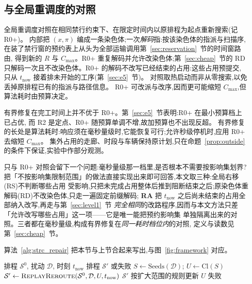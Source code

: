\documentclass[manuscript,screen,review]{acmart}
\begin{document}
\subsection{与全局重调度的对照}
\label{sec:vs_r0}

全局重调度对照在相同禁行约束下、在限定时间内以原排程为起点重新搜索(记 R0+)。
内部把 \((x,\pi)\) 编成一条染色体;一次\emph{解码}指:按该染色体的指派与扫描序,
在装了禁行窗的预约表上从头为全部运输调用第~\ref{sec:reservation}~节的时间窗路由,
得到新的 \(R\) 与 \(C_{\max}\)。R0+ 重复解码并允许改染色体;第~\ref{sec:cheap}~节的
RD 只解码一次且不改染色体。R0+ 的解码不改写已经结束的占用:这些占用预提交,
只从 \(t_{\mathrm{now}}\) 接着排未开始的工序(第~\ref{sec:e5}~节)。
对照取热启动而非从零搜索,以免丢掉原排程已有的指派与路径信息。
R0+ 可改派与改序,因而更可能缩短 \(C_{\max}\),但算法耗时由预算决定。

有界修复在完工时间上并不优于 R0+。第~\ref{sec:e5}~节表明:R0+ 在最小预算档上已占优,
而 R2 是定点、R0+ 随预算单调不增,故加预算也不出现反超。
有界修复的长处是算法耗时:响应须在毫秒量级时,它能恢复可行;允许秒级停机时,应用 R0+ 去缩短 \(C_{\max}\)。
集外占用的走廊、时段与车辆保持原计划,只在命题~\ref{prop:outside} 的条件下保证,实验中作部分观测。

只与 R0+ 对照会留下一个问题:毫秒量级那一档里,是否根本不需要按影响集划界?
把「不按影响集限制范围」的做法直接实现出来即可回答,本文取三种:全局右移(RS)不判断哪些占用
受影响,只把未完成占用整体后推到阻断结束之后;原染色体重解码(RD)不改染色体,只走一遍固定前缀解码;
\textbf{RA} 把 \(t_{\mathrm{now}}\) 之后尚未结束的占用全部纳入改写,再走与第~\ref{sec:level1}~节
\emph{完全相同}的改路程序,因而与本文方法只差「允许改写哪些占用」这一项——它是唯一能把预约影响集
单独隔离出来的对照。三者都在毫秒量级,构成有界修复在\emph{同一耗时档位内}的对照,
定义与读数见第~\ref{sec:cheap}~节。

算法~\ref{alg:strc_repair} 把本节与上节合起来写出,与图~\ref{fig:framework} 对应。

\begin{algorithm}[t]
\caption{基于预约影响集的有界恢复(第 1 级改路 + 扩大范围)}
\label{alg:strc_repair}
\begin{algorithmic}[1]
\Require 排程 \(\mathcal{S}^0\), 扰动 \(\mathcal{D}\), 时刻 \(t_{\mathrm{now}}\)
\Ensure 排程 \(\mathcal{S}'\) 或失败
\State \(S \gets \mathrm{Seeds}(\mathcal{D})\);
      \(U \gets \mathrm{Cl}(S)\)
  \State \(\mathcal{S}' \gets \textsc{ReplayReroute}(\mathcal{S}^0,\mathcal{D},U,t_{\mathrm{now}})\)
    \State \Return \(\mathcal{S}'\)
  \EndIf
  \State 按扩大范围的规则更新 \(U\) 
\EndFor
\State \Return 失败
\end{algorithmic}
\end{algorithm}
\end{document}
